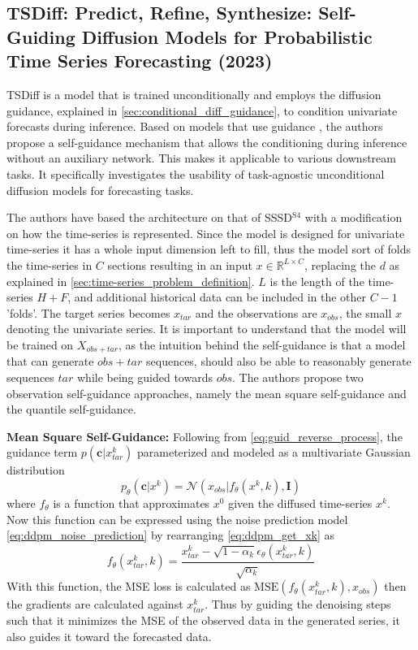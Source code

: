 \subsection{TSDiff: Predict, Refine, Synthesize: Self-Guiding Diffusion Models for Probabilistic Time Series Forecasting (2023) \cite{kollovieh_predict_2023}} \label{sec:tsdiff}
TSDiff is a model that is trained unconditionally and employs the diffusion guidance, explained in \autoref{sec:conditional_diff_guidance}, to condition univariate forecasts during inference. Based on models that use guidance \cite{dhariwal_diffusion_2021, ho_classifier-free_2022}, the authors propose a self-guidance mechanism that allows the conditioning during inference without an auxiliary network. This makes it applicable to various downstream tasks. It specifically investigates the usability of task-agnostic unconditional diffusion models for forecasting tasks.

The authors have based the architecture on that of SSSD$^{\text{S4}}$ with a modification on how the time-series is represented. Since the model is designed for univariate time-series it has a whole input dimension left to fill, thus the model sort of folds the time-series in $C$ sections resulting in an input $x \in \mathbb{R}^{L \times C}$, replacing the $d$ as explained in \autoref{sec:time-series_problem_definition}. $L$ is the length of the time-series $H+F$, and additional historical data can be included in the other $C-1$ 'folds'. The target series becomes $x_{tar}$ and the observations are $x_{obs}$, the small $x$ denoting the univariate series. It is important to understand that the model will be trained on $X_{obs+tar}$, as the intuition behind the self-guidance is that a model that can generate $obs+tar$ sequences, should also be able to reasonably generate sequences $tar$ while being guided towards $obs$.
The authors propose two observation self-guidance approaches, namely the mean square self-guidance and the quantile self-guidance. 

\textbf{Mean Square Self-Guidance:}
Following from \autoref{eq:guid_reverse_process}, the guidance term $p(\mathbf{c}|x_{tar}^k)$ parameterized and modeled as a multivariate Gaussian distribution
\begin{equation}
    p_\theta(\mathbf{c} | x^k) = \mathcal{N}(x_{obs}| f_\theta(x^k, k), \mathbf{I})    
\end{equation}
where $f_\theta$ is a function that approximates $x^0$ given the diffused time-series $x^k$. Now this function can be expressed using the noise prediction model \eqref{eq:ddpm_noise_prediction} by rearranging \autoref{eq:ddpm_get_xk} as
\begin{equation}
    f_\theta(x_{tar}^k, k) = \frac{x_{tar}^k - \sqrt{1 - \alpha_k} \epsilon_\theta(x_{tar}^k, k)}{\sqrt{\alpha_k}}
\end{equation}
With this function, the MSE loss is calculated as $\text{MSE}(f_\theta(x_{tar}^k, k), x_{obs})$ then the gradients are calculated against $x_{tar}^k$. Thus by guiding the denoising steps such that it minimizes the MSE of the observed data in the generated series, it also guides it toward the forecasted data.

